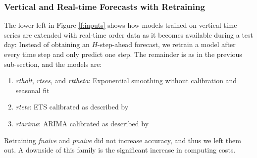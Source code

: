 \subsubsection{Vertical and Real-time Forecasts with Retraining}
\label{rt}

The lower-left in Figure \ref{f:inputs} shows how models trained on vertical
    time series are extended with real-time order data as it becomes available
    during a test day:
Instead of obtaining an $H$-step-ahead forecast, we retrain a model after
    every time step and only predict one step.
The remainder is as in the previous sub-section, and the models are:
\begin{enumerate}
\item \textit{rtholt},
      \textit{rtses}, and
      \textit{rttheta}:
          Exponential smoothing without calibration and seasonal fit
\item \textit{rtets}:
          ETS calibrated as described by \cite{hyndman2008b}
\item \textit{rtarima}:
          ARIMA calibrated as described by \cite{hyndman2008a}
\end{enumerate}
Retraining \textit{fnaive} and \textit{pnaive} did not increase accuracy, and
    thus we left them out.
A downside of this family is the significant increase in computing costs.
